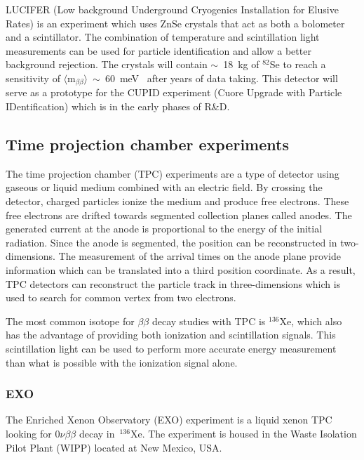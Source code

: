 \documentclass[main.tex]{subfiles}
\begin{document}
\NI LUCIFER (Low background Underground Cryogenics Installation for Elusive Rates) is an experiment which uses ZnSe crystals that act as both a bolometer and a scintillator. The combination of temperature and scintillation light measurements can be used for particle identification and allow a better background rejection. The crystals will contain $\sim$~18~kg of $^{\text{82}}$Se to reach a sensitivity of $\langle \text{m}_{\beta\beta} \rangle$~$\sim$~60~meV~\cite{LUCIFER} after years of data taking. This detector will serve as a prototype for the CUPID experiment (Cuore Upgrade with Particle IDentification) which is in the early phases of R\&D.


\subsection{Time projection chamber experiments}


\NI The time projection chamber (TPC) experiments are a type of detector using gaseous or liquid medium combined with an electric field. By crossing the detector, charged particles ionize the medium and produce free electrons. These free electrons are drifted towards segmented collection planes called anodes. The generated current at the anode is proportional to the energy of the initial radiation. Since the anode is segmented, the position can be reconstructed in two-dimensions. The measurement of the arrival times on the anode plane provide information which can be translated into a third position coordinate. As a result, TPC detectors can reconstruct the particle track in three-dimensions which is used to search for common vertex from two electrons.


\bigskip


\NI The most common isotope for $\beta\beta$ decay studies with TPC is $^{\text{136}}$Xe, which also has the advantage of providing both ionization and scintillation signals. This scintillation light can be used to perform more accurate energy measurement than what is possible with the ionization signal alone.    


\subsubsection{EXO}


\NI The Enriched Xenon Observatory (EXO) experiment is a liquid xenon TPC looking for 0$\nu\beta\beta$ decay in~$^{\text{136}}$Xe. The experiment is housed in the Waste Isolation Pilot Plant (WIPP) located at New Mexico, USA. 
\end{document}

